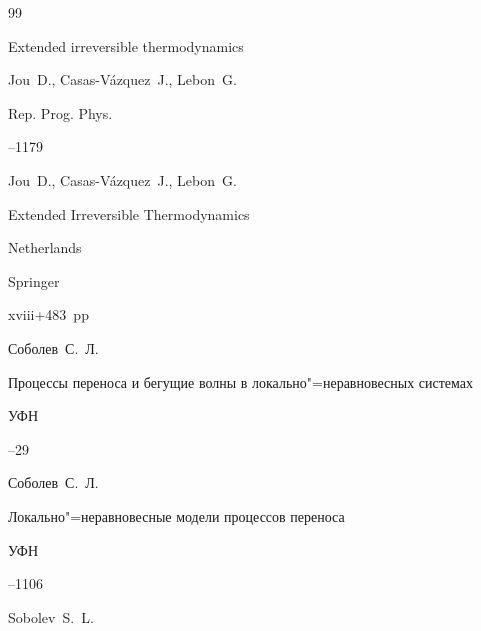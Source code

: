 \begin{thebibliography}{99}

\paper Extended irreversible thermodynamics

\by Jou~D.,  Casas-V\'azquez~J., Lebon~G.


\jour Rep. Prog. Phys. 



--1179





\by Jou~D.,  Casas-V\'azquez~J., Lebon~G.

\book Extended Irreversible Thermodynamics

\publaddr Netherlands

\publ     Springer 


\totalpages xviii+483~pp \nofrills





\by Соболев~С.~Л.

\paper Процессы переноса и бегущие волны в локально"=неравновесных системах

\jour УФН




--29





\by Соболев~С.~Л.

\paper Локально"=неравновесные модели процессов переноса

\jour УФН




--1106






\by Sobolev~S.~L.


\end{thebibliography}
